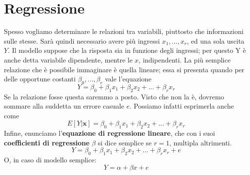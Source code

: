 \documentclass[11pt]{article}
\begin{document}
\section{Regressione}
Spesso vogliamo determinare le relazioni tra variabili, piuttosto che informazioni sulle stesse. Sarà quindi necessario avere più ingressi $x_1,...,x_r$, ed una sola uscita $Y$. Il modello suppose che la risposta sia in funzione degli ingressi; per questo Y è anche detta variabile dipendente, mentre le $x$, indipendenti. La più semplice relazione che è possibile immaginare è quella lineare; essa si presenta quando per delle opportune costanti $\beta_0,...,\beta_r$ vale l'equazione
\begin{displaymath}
    Y=\beta_0+\beta_1 x_1+\beta_2x_2+...+\beta_rx_r
\end{displaymath}
Se la relazione fosse questa saremmo a posto. Visto che non la è, dovremo sommare alla suddetta un errore casuale $e$. Possiamo infatti esprimerla anche come 
\begin{displaymath}
    E[Y|\textbf{x}]=\beta_0+\beta_1 x_1+\beta_2x_2+...+\beta_rx_r
\end{displaymath}
Infine, enunciamo l'\textbf{equazione di regressione lineare}, che con i suoi \textbf{coefficienti di regressione} $\beta$ si dice semplice se $r=1$, multipla altrimenti.
\begin{displaymath}
    Y=\beta_0+\beta_1 x_1+\beta_2x_2+...+\beta_rx_r+e
\end{displaymath}
O, in caso di modello semplice:
\begin{displaymath}
    Y=\alpha+\beta x+e
\end{displaymath}
\end{document}
